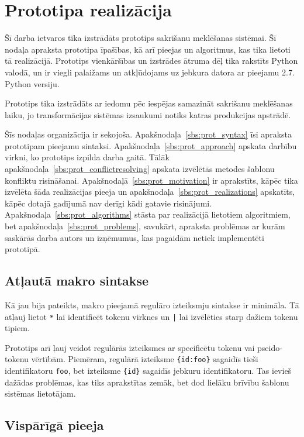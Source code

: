 \section{\label{s:prototype}Prototipa realizācija}

Šī darba ietvaros tika izstrādāts prototips sakrišanu meklēšanas sistēmai. Šī nodaļa apraksta prototipa īpašības, kā arī pieejas un algoritmus, kas tika lietoti tā realizācijā. Prototips vienkāršības un izstrādes ātruma dēļ tika rakstīts Python valodā, un ir viegli palaižams un atkļūdojams uz jebkura datora ar pieejamu 2.7. Python versiju.

Prototips tika izstrādāts ar iedomu pēc iespējas samazināt sakrišanu meklēšanas laiku, jo transformācijas sistēmas izsaukumi notiks katras produkcijas apstrādē.

Šīs nodaļas organizācija ir sekojoša. Apakšnodaļa~\ref{sbs:prot_syntax} īsi apraksta prototipam pieejamu sintaksi. Apakšnodaļa~\ref{sbs:prot_approach} apskata darbību virkni, ko prototips izpilda darba gaitā. Tālāk apakšnodaļa~\ref{sbs:prot_conflictresolving} apskata izvēlētās metodes šablonu konfliktu risināšanai. Apakšnodaļā~\ref{sbs:prot_motivation} ir aprakstīts, kāpēc tika izvēlēta šāda realizācijas pieeja un apakšnodaļa~\ref{sbs:prot_realizations} apskatīts, kāpēc dotajā gadījumā nav derīgi kādi gatavie risinājumi. Apakšnodaļa~\ref{sbs:prot_algorithms} stāsta par realizācijā lietotiem algoritmiem, bet apakšnodaļa~\ref{sbs:prot_problems}, savukārt, apraksta problēmas ar kurām saskārās darba autors un izņēmumus, kas pagaidām netiek implementēti prototipā.

\subsection{\label{sbs:prot_syntax}Atļautā makro sintakse}

Kā jau bija pateikts, makro pieejamā regulāro izteiksmju sintakse ir minimāla. Tā atļauj lietot \verb|*| lai identificēt tokenu virknes un \verb/|/ lai izvēlēties starp dažiem tokenu tipiem.

Prototips arī ļauj veidot regulārās izteiksmes ar specificētu tokenu vai pseido-tokenu vērtībām. Piemēram, regulārā izteiksme \verb|{id:foo}| sagaidīs tieši identifikatoru \verb|foo|, bet izteiksme \verb|{id}| sagaidīs jebkuru identifikatoru. Tas ievieš dažādas problēmas, kas tiks aprakstītas zemāk, bet dod lielāku brīvību šablonu sistēmas lietotājam.

\subsection{\label{sbs:prot_approach}Vispārīgā pieeja}

